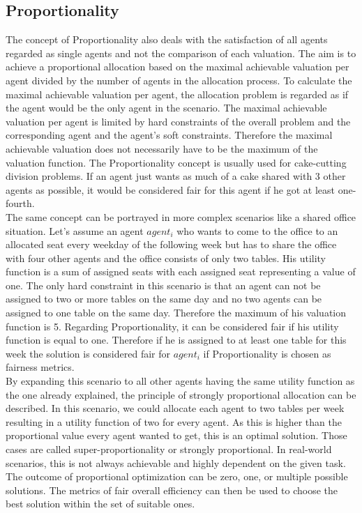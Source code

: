 \documentclass[german, a4paper, 11pt, oneside]{scrbook}
\begin{document}
\subsection{Proportionality}
The concept of Proportionality also deals with the satisfaction of all agents regarded as single agents and not the comparison of each valuation. The aim is to achieve a proportional allocation based on the maximal achievable valuation per agent divided by the number of agents in the allocation process. To calculate the maximal achievable valuation per agent, the allocation problem is regarded as if the agent would be the only agent in the scenario. \cite{Brandt,Cappelen.2017} The maximal achievable valuation per agent is limited by hard constraints of the overall problem and the corresponding agent and the agent's soft constraints. Therefore the maximal achievable valuation does not necessarily have to be the maximum of the valuation function. The Proportionality concept is usually used for cake-cutting division problems. If an agent just wants as much of a cake shared with 3 other agents as possible, it would be considered fair for this agent if he got at least one-fourth. \\The same concept can be portrayed in more complex scenarios like a shared office situation. Let's assume an agent $agent_i$ who wants to come to the office to an allocated seat every weekday of the following week but has to share the office with four other agents and the office consists of only two tables. His utility function is a sum of assigned seats with each assigned seat representing a value of one. The only hard constraint in this scenario is that an agent can not be assigned to two or more tables on the same day and no two agents can be assigned to one table on the same day. Therefore the maximum of his valuation function is 5.  Regarding Proportionality, it can be considered fair if his utility function is equal to one. Therefore if he is assigned to at least one table for this week the solution is considered fair for $agent_i$ if Proportionality is chosen as fairness metrics. \\By expanding this scenario to all other agents having the same utility function as the one already explained, the principle of strongly proportional allocation can be described. In this scenario, we could allocate each agent to two tables per week resulting in a utility function of two for every agent. As this is higher than the proportional value every agent wanted to get, this is an optimal solution. Those cases are called super-proportionality or strongly proportional. \cite{Janko.23.12.2023} In real-world scenarios, this is not always achievable and highly dependent on the given task. \\The outcome of proportional optimization can be zero, one, or multiple possible solutions. The metrics of fair overall efficiency can then be used to choose the best solution within the set of suitable ones. 
\newpage
\end{document}
